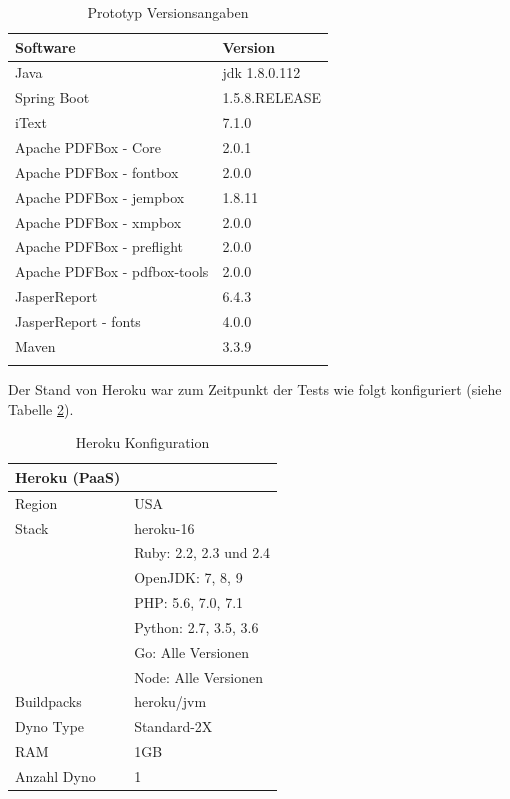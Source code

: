 \documentclass[main.tex]{subfiles}
\begin{document}
\begin{table}[!ht]
\centering
\begin{tabular}{ll}
Software          & Version   \\ \hline
Java        &      jdk 1.8.0.112      \\
Spring Boot &         1.5.8.RELEASE        \\

iText        &        7.1.0  \\
Apache PDFBox - Core &  2.0.1 \\
Apache PDFBox - fontbox & 2.0.0 \\
Apache PDFBox - jempbox & 1.8.11 \\
Apache PDFBox - xmpbox & 2.0.0 \\
Apache PDFBox - preflight & 2.0.0 \\
Apache PDFBox - pdfbox-tools & 2.0.0 \\
JasperReport & 6.4.3 \\
JasperReport - fonts & 4.0.0 \\
Maven   &  3.3.9 \\
 & \\


\end{tabular}
\caption{Prototyp Versionsangaben}
\label{softversion}

\end{table}
Der Stand von Heroku war zum Zeitpunkt der Tests wie folgt konfiguriert (siehe Tabelle \ref{herokuversion}).
\begin{table}[!hb]
\centering

\begin{tabular}{ll}

Heroku (PaaS)    & \\ \hline
Region & USA \\
Stack & heroku-16 \\
 & Ruby: 2.2, 2.3 und 2.4\\
 & OpenJDK: 7, 8, 9\\
 & PHP: 5.6, 7.0, 7.1\\
 & Python: 2.7, 3.5, 3.6\\
 & Go: Alle Versionen\\
 & Node: Alle Versionen \\
Buildpacks & heroku/jvm \\
Dyno Type & Standard-2X \\
RAM & 1GB \\
Anzahl Dyno & 1 \\


\end{tabular}
\caption{Heroku Konfiguration}
\label{herokuversion}
\end{table}
\end{document}
